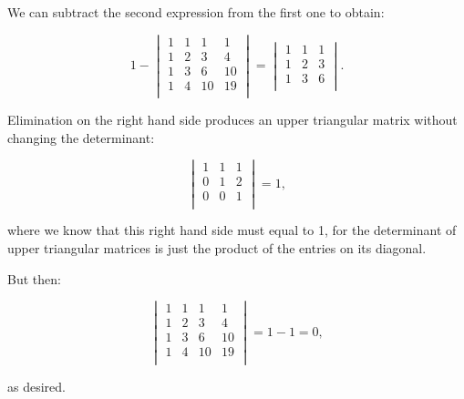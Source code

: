\documentclass{article}
\begin{document}
We can subtract the second expression from the first one to obtain:

\[
1
-
\begin{vmatrix}
1 & 1 & 1 & 1\\
1 & 2 & 3 & 4\\
1 & 3 & 6 & 10\\
1 & 4 & 10 & 19\\
\end{vmatrix}
=
\begin{vmatrix}
1 & 1 & 1\\
1 & 2 & 3\\
1 & 3 & 6\\
\end{vmatrix}.
\]

Elimination on the right hand side produces an upper triangular matrix without changing the determinant:

\[
\begin{vmatrix}
1 & 1 & 1\\
0 & 1 & 2\\
0 & 0 & 1\\
\end{vmatrix}
= 1,
\]

where we know that this right hand side must equal to 1, for the determinant of upper triangular matrices is just the product of the entries on its diagonal.

But then:

\[
\begin{vmatrix}
1 & 1 & 1 & 1\\
1 & 2 & 3 & 4\\
1 & 3 & 6 & 10\\
1 & 4 & 10 & 19\\
\end{vmatrix}
=
1 - 1 = 0,
\]

as desired.
\end{document}

